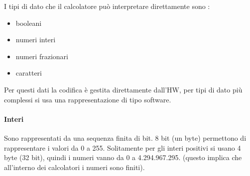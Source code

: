 \documentclass[
  paper=a4,
  oneside  ,captions=tableheading
]{scrbook}
\providecommand{\tightlist}{%
  \setlength{\itemsep}{0pt}\setlength{\parskip}{0pt}}
\begin{document}
I tipi di dato che il calcolatore può interpretare direttamente sono :

\begin{itemize}
\tightlist
\item
  booleani
\item
  numeri interi
\item
  numeri frazionari
\item
  caratteri
\end{itemize}

Per questi dati la codifica è gestita direttamente dall'HW, per tipi di
dato più complessi si usa una rappresentazione di tipo software.

\hypertarget{interi}{%
\paragraph{Interi}\label{interi}}

Sono rappresentati da una sequenza finita di bit. 8 bit (un byte)
permettono di rappresentare i valori da 0 a 255. Solitamente per gli
interi positivi si usano 4 byte (32 bit), quindi i numeri vanno da 0 a
4.294.967.295. (questo implica che all'interno dei calcolatori i numeri
sono finiti).
\end{document}
